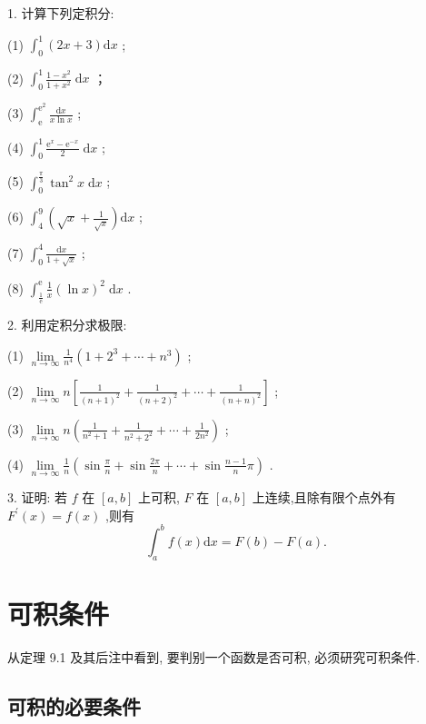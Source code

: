 1. 计算下列定积分:

(1) \({\int }_{0}^{1}\left( {{2x} + 3}\right) \mathrm{d}x\) ;

(2) \({\int }_{0}^{1}\frac{1 - {x}^{2}}{1 + {x}^{2}}\mathrm{\;d}x\) ；

(3) \({\int }_{\mathrm{e}}^{{\mathrm{e}}^{2}}\frac{\mathrm{d}x}{x\ln x}\) ;

(4) \({\int }_{0}^{1}\frac{{\mathrm{e}}^{x} - {\mathrm{e}}^{-x}}{2}\mathrm{\;d}x\) ;

(5) \({\int }_{0}^{\frac{\pi }{3}}{\tan }^{2}x\mathrm{\;d}x\) ;

(6) \({\int }_{4}^{9}\left( {\sqrt{x} + \frac{1}{\sqrt{x}}}\right) \mathrm{d}x\) ;

(7) \({\int }_{0}^{4}\frac{\mathrm{d}x}{1 + \sqrt{x}}\) ;

(8) \({\int }_{\frac{1}{\mathrm{e}}}^{\mathrm{e}}\frac{1}{x}{\left( \ln x\right) }^{2}\mathrm{\;d}x\) .

2. 利用定积分求极限:

(1) \(\mathop{\lim }\limits_{{n \rightarrow  \infty }}\frac{1}{{n}^{4}}\left( {1 + {2}^{3} + \cdots  + {n}^{3}}\right)\) ;

(2) \(\mathop{\lim }\limits_{{n \rightarrow  \infty }}n\left\lbrack  {\frac{1}{{\left( n + 1\right) }^{2}} + \frac{1}{{\left( n + 2\right) }^{2}} + \cdots  + \frac{1}{{\left( n + n\right) }^{2}}}\right\rbrack\) ;

(3) \(\mathop{\lim }\limits_{{n \rightarrow  \infty }}n\left( {\frac{1}{{n}^{2} + 1} + \frac{1}{{n}^{2} + {2}^{2}} + \cdots  + \frac{1}{2{n}^{2}}}\right)\) ;

(4) \(\mathop{\lim }\limits_{{n \rightarrow  \infty }}\frac{1}{n}\left( {\sin \frac{\pi }{n} + \sin \frac{2\pi }{n} + \cdots  + \sin \frac{n - 1}{n}\pi }\right)\) .

3. 证明: 若 \(f\) 在 \(\left\lbrack  {a,b}\right\rbrack\) 上可积, \(F\) 在 \(\left\lbrack  {a,b}\right\rbrack\) 上连续,且除有限个点外有 \({F}^{\prime }\left( x\right)  = f\left( x\right)\) ,则有
\[
{\int }_{a}^{b}f\left( x\right) \mathrm{d}x = F\left( b\right)  - F\left( a\right) .
\]
\section{可积条件}

从定理 9.1 及其后注中看到, 要判别一个函数是否可积, 必须研究可积条件.

\subsection{可积的必要条件}

